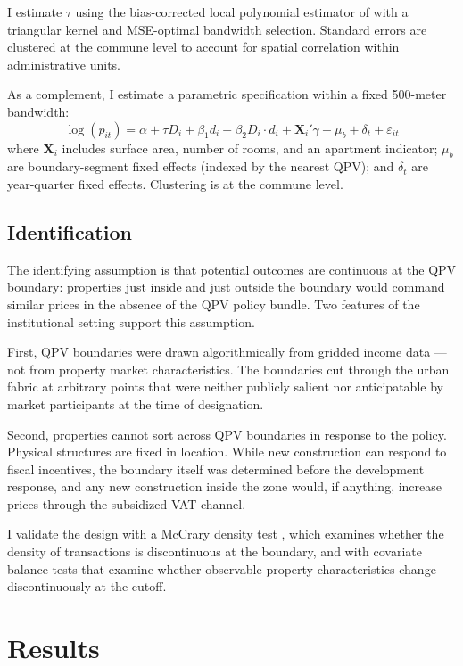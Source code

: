 \documentclass[12pt]{article}
\begin{document}
I estimate $\tau$ using the bias-corrected local polynomial estimator of \citet{calonico2014robust} with a triangular kernel and MSE-optimal bandwidth selection. Standard errors are clustered at the commune level to account for spatial correlation within administrative units.

As a complement, I estimate a parametric specification within a fixed 500-meter bandwidth:
\begin{equation}
\log(p_{it}) = \alpha + \tau D_i + \beta_1 d_i + \beta_2 D_i \cdot d_i + \mathbf{X}_i'\gamma + \mu_b + \delta_t + \varepsilon_{it}
\end{equation}
where $\mathbf{X}_i$ includes surface area, number of rooms, and an apartment indicator; $\mu_b$ are boundary-segment fixed effects (indexed by the nearest QPV); and $\delta_t$ are year-quarter fixed effects. Clustering is at the commune level.

\subsection{Identification}

The identifying assumption is that potential outcomes are continuous at the QPV boundary: properties just inside and just outside the boundary would command similar prices in the absence of the QPV policy bundle. Two features of the institutional setting support this assumption.

First, QPV boundaries were drawn algorithmically from gridded income data --- not from property market characteristics. The boundaries cut through the urban fabric at arbitrary points that were neither publicly salient nor anticipatable by market participants at the time of designation.

Second, properties cannot sort across QPV boundaries in response to the policy. Physical structures are fixed in location. While new construction can respond to fiscal incentives, the boundary itself was determined before the development response, and any new construction inside the zone would, if anything, increase prices through the subsidized VAT channel.

I validate the design with a McCrary density test \citep{cattaneo2020simple}, which examines whether the density of transactions is discontinuous at the boundary, and with covariate balance tests that examine whether observable property characteristics change discontinuously at the cutoff.


\section{Results}
\end{document}
